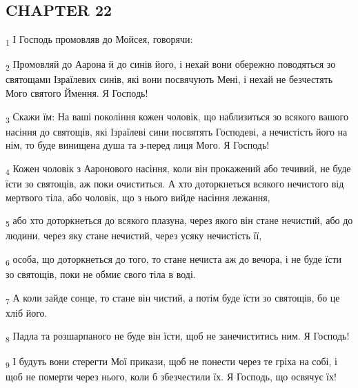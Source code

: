 \subsection{CHAPTER 22}
\begin{tcolorbox}
\textsubscript{1} І Господь промовляв до Мойсея, говорячи:
\end{tcolorbox}
\begin{tcolorbox}
\textsubscript{2} Промовляй до Аарона й до синів його, і нехай вони обережно поводяться зо святощами Ізраїлевих синів, які вони посвячують Мені, і нехай не безчестять Мого святого Ймення. Я Господь!
\end{tcolorbox}
\begin{tcolorbox}
\textsubscript{3} Скажи їм: На ваші покоління кожен чоловік, що наблизиться зо всякого вашого насіння до святощів, які Ізраїлеві сини посвятять Господеві, а нечистість його на нім, то буде винищена душа та з-перед лиця Мого. Я Господь!
\end{tcolorbox}
\begin{tcolorbox}
\textsubscript{4} Кожен чоловік з Ааронового насіння, коли він прокажений або течивий, не буде їсти зо святощів, аж поки очиститься. А хто доторкнеться всякого нечистого від мертвого тіла, або чоловік, що з нього вийде насіння лежання,
\end{tcolorbox}
\begin{tcolorbox}
\textsubscript{5} або хто доторкнеться до всякого плазуна, через якого він стане нечистий, або до людини, через яку стане нечистий, через усяку нечистість її,
\end{tcolorbox}
\begin{tcolorbox}
\textsubscript{6} особа, що доторкнеться до того, то стане нечиста аж до вечора, і не буде їсти зо святощів, поки не обмиє свого тіла в воді.
\end{tcolorbox}
\begin{tcolorbox}
\textsubscript{7} А коли зайде сонце, то стане він чистий, а потім буде їсти зо святощів, бо це хліб його.
\end{tcolorbox}
\begin{tcolorbox}
\textsubscript{8} Падла та розшарпаного не буде він їсти, щоб не занечиститись ним. Я Господь!
\end{tcolorbox}
\begin{tcolorbox}
\textsubscript{9} І будуть вони стерегти Мої прикази, щоб не понести через те гріха на собі, і щоб не померти через нього, коли б збезчестили їх. Я Господь, що освячує їх!
\end{tcolorbox}
